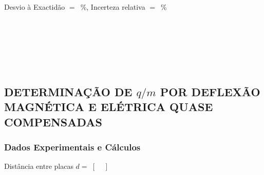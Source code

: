 \documentclass[a4paper,12pt]{article}  %
\begin{document}
\noindent  Desvio à Exactidão $=$~\underline{\makebox[1cm][r]{~}}\%, 
Incerteza relativa $=$~\underline{\makebox[1cm][r]{~}}\% 

\noindent\underline{\makebox[\textwidth][r]{~}} \\
\noindent\underline{\makebox[\textwidth][r]{~}} \\
\noindent\underline{\makebox[\textwidth][r]{~}} \\
\noindent\underline{\makebox[\textwidth][r]{~}} \\
\noindent\underline{\makebox[\textwidth][r]{~}} \\


\subsection{\sf DETERMINAÇÃO DE $q/m$ POR DEFLEXÃO\\ MAGNÉTICA E ELÉTRICA QUASE COMPENSADAS }

\subsubsection{\sf Dados Experimentais e Cálculos}

\noindent  Distância entre placas  $d=$~\underline{\makebox[1cm][r]{~}}[~~~] 
\end{document}
